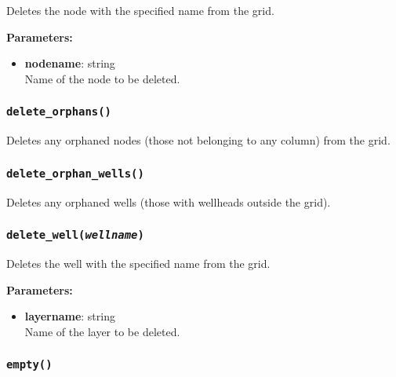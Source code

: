 Deletes the node with the specified name from the grid.

\textbf{Parameters:}
\begin{itemize}
\item \textbf{nodename}: string\\
  Name of the node to be deleted.
\end{itemize}

\begin{snugshade}\subsubsection{\texttt{delete\_orphans()}}\end{snugshade}
\label{sec:mulgrid:delete_orphans}

Deletes any orphaned nodes (those not belonging to any column) from the grid.

\begin{snugshade}\subsubsection{\texttt{delete\_orphan\_wells()}}\end{snugshade}
\label{sec:mulgrid:delete_orphan_wells}

Deletes any orphaned wells (those with wellheads outside the grid).

\begin{snugshade}\subsubsection{\texttt{delete\_well(\emph{wellname})}}\end{snugshade}
\label{sec:mulgrid:delete_well}

Deletes the well with the specified name from the grid.

\textbf{Parameters:}
\begin{itemize}
\item \textbf{layername}: string\\
  Name of the layer to be deleted.
\end{itemize}

\begin{snugshade}\subsubsection{\texttt{empty()}}\end{snugshade}
\label{sec:mulgrid:empty}

